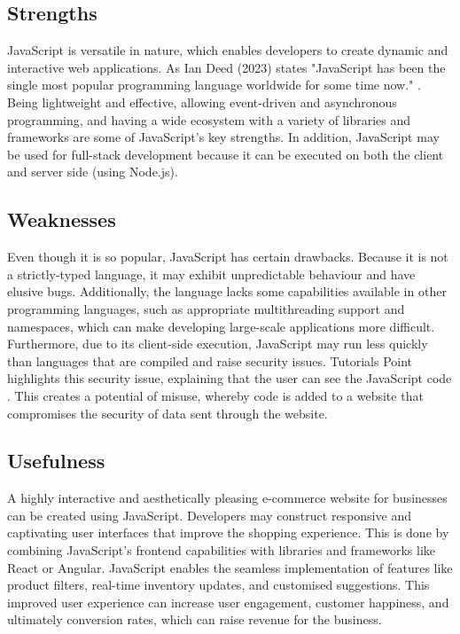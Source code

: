 \documentclass[a4paper, 11pt]{report}
\begin{document}
\subsection{Strengths}

 JavaScript is versatile in nature, which enables developers to create dynamic and interactive web applications. As Ian Deed (2023) states "JavaScript has been the single most popular programming language worldwide for some time now." \cite{PangeaBestPractices}. Being lightweight and effective, allowing event-driven and asynchronous programming, and having a wide ecosystem with a variety of libraries and frameworks are some of JavaScript's key strengths. In addition, JavaScript may be used for full-stack development because it can be executed on both the client and server side (using Node.js).

\subsection{Weaknesses}
Even though it is so popular, JavaScript has certain drawbacks. Because it is not a strictly-typed language, it may exhibit unpredictable behaviour and have elusive bugs. Additionally, the language lacks some capabilities available in other programming languages, such as appropriate multithreading support and namespaces, which can make developing large-scale applications more difficult. Furthermore, due to its client-side execution, JavaScript may run less quickly than languages that are compiled and raise security issues. Tutorials Point highlights this security issue, explaining that the user can see the JavaScript code \cite{TutorialsPointAdvDisadv}. This creates a potential of misuse, whereby code is added to a website that compromises the security of data sent through the website.

\subsection{Usefulness}
A highly interactive and aesthetically pleasing e-commerce website for businesses can be created using JavaScript. Developers may construct responsive and captivating user interfaces that improve the shopping experience. This is done by combining JavaScript's frontend capabilities with libraries and frameworks like React or Angular. JavaScript enables the seamless implementation of features like product filters, real-time inventory updates, and customised suggestions. This improved user experience can increase user engagement, customer happiness, and ultimately conversion rates, which can raise revenue for the business.
\end{document}
